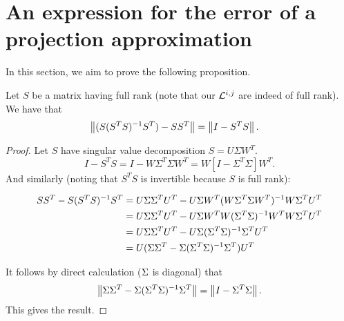 \section{An expression for the error of a projection approximation}
\label{app:proj}
In this section, we aim to prove the following proposition.

\begin{prop}{Let $S$ be a matrix having full rank (note that our $\mathcal{L}^{i,j}$ are indeed of full rank).  We have that
\[
\begin{aligned}
\left\lVert(S(S^TS)^{-1}S^T) - SS^T\right\rVert &= \left\lVert I - S^TS\right\rVert.
\end{aligned}
\]
}
\end{prop}
\begin{proof}
Let $S$ have singular value decomposition $S=U\Sigma W^T.$ 
\[
I - S^TS = I - W\Sigma^T\Sigma W^T = W[I - \Sigma^T\Sigma]W^T.
\]
And similarly (noting that $S^TS$ is invertible because $S$ is full rank):
\begin{widetext}
\[
\begin{aligned}
SS^T - S(S^TS)^{-1}S^T &=U\Sigma\Sigma^TU^T - U\Sigma W^T(W\Sigma^T\Sigma W^T)^{-1}W\Sigma^TU^T\\
&=U\Sigma\Sigma^TU^T - U\Sigma W^TW(\Sigma^T\Sigma)^{-1}W^TW\Sigma^TU^T\\
&=U\Sigma\Sigma^TU^T - U\Sigma(\Sigma^T\Sigma)^{-1}\Sigma^TU^T\\
& = U(\Sigma\Sigma^T - \Sigma(\Sigma^T\Sigma)^{-1}\Sigma^T)U^T\\
\end{aligned}
\]
\end{widetext}

It follows by direct calculation ($\Sigma$ is diagonal) that
\[
\left\lVert\Sigma\Sigma^T - \Sigma(\Sigma^T\Sigma)^{-1}\Sigma^T\right\rVert = \left\lVert I - \Sigma^T\Sigma\right\rVert.
\]
This gives the result.
\end{proof}